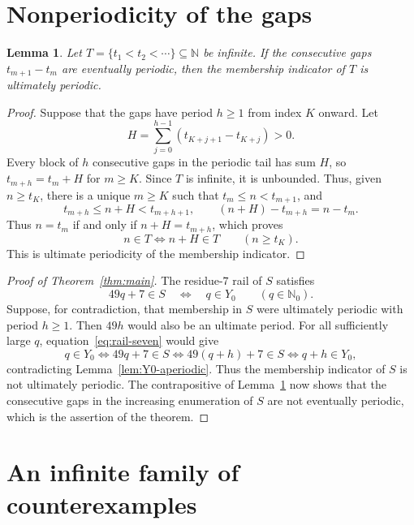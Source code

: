 \documentclass[11pt,letterpaper]{article}
\newtheorem{lemma}[theorem]{Lemma}
\newcommand{\N}{\mathbb{N}}
\newcommand{\Nzero}{\mathbb{N}_0}
\begin{document}
\section{Nonperiodicity of the gaps}

\begin{lemma}\label{lem:gaps-imply-membership}
Let \(T=\{t_1<t_2<\cdots\}\subseteq\N\) be infinite. If the consecutive gaps \(t_{m+1}-t_m\) are eventually periodic, then the membership indicator of \(T\) is ultimately periodic.
\end{lemma}

\begin{proof}
Suppose that the gaps have period \(h\geq1\) from index \(K\) onward. Let
\[
H=\sum_{j=0}^{h-1}(t_{K+j+1}-t_{K+j})>0.
\]
Every block of \(h\) consecutive gaps in the periodic tail has sum $H$, so \(t_{m+h}=t_m+H\) for \(m\geq K\). Since \(T\) is infinite, it is unbounded. Thus, given \(n\geq t_K\), there is a unique \(m\geq K\) such that \(t_m\leq n<t_{m+1}\), and
\[
t_{m+h}\leq n+H<t_{m+h+1},
\qquad
(n+H)-t_{m+h}=n-t_m.
\]
Thus \(n=t_m\) if and only if \(n+H=t_{m+h}\), which proves
\[
n\in T\iff n+H\in T
\qquad(n\geq t_K).
\]
This is ultimate periodicity of the membership indicator.
\end{proof}

\begin{proof}[Proof of Theorem~\ref{thm:main}]
The residue-\(7\) rail of \(S\) satisfies
\begin{equation}\label{eq:rail-seven}
49q+7\in S\quad\Longleftrightarrow\quad q\in Y_0
\qquad(q\in\Nzero).
\end{equation}
Suppose, for contradiction, that membership in \(S\) were ultimately periodic with period \(h\geq1\). Then \(49h\) would also be an ultimate period. For all sufficiently large \(q\), equation~\eqref{eq:rail-seven} would give
\[
q\in Y_0
\iff49q+7\in S
\iff49(q+h)+7\in S
\iff q+h\in Y_0,
\]
contradicting Lemma~\ref{lem:Y0-aperiodic}. Thus the membership indicator of \(S\) is not ultimately periodic. The contrapositive of Lemma~\ref{lem:gaps-imply-membership} now shows that the consecutive gaps in the increasing enumeration of \(S\) are not eventually periodic, which is the assertion of the theorem.
\end{proof}

\section{An infinite family of counterexamples}
\end{document}
